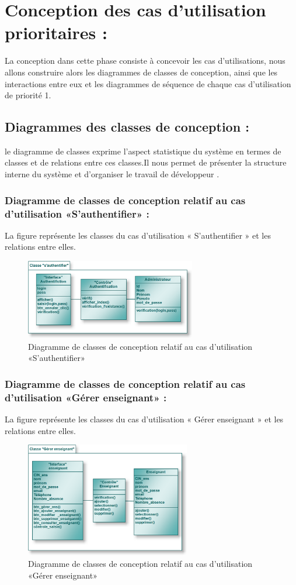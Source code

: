 \documentclass[12 pt]{report}
\begin{document}
\section{Conception des cas d’utilisation prioritaires :}
La conception dans cette phase consiste à concevoir les cas d’utilisations, nous allons construire alors les diagrammes de classes de conception, ainsi que les interactions entre eux et les diagrammes de séquence de chaque cas d’utilisation de priorité 1.
\subsection{Diagrammes des classes de conception :}
le diagramme de classes exprime l'aspect statistique du système en termes de classes et de relations entre ces classes.Il nous permet de présenter la structure interne du système et d'organiser le travail de développeur .
\subsubsection{Diagramme de classes de conception relatif au cas d’utilisation «S’authentifier» :}
La figure  représente les classes du cas d’utilisation « S’authentifier » et les relations entre elles.
\begin{figure}[h]
 \begin{center}
\includegraphics[width= 12 cm ,height=  3.5cm]{cl_auth.PNG}
\caption{Diagramme de classes de conception relatif au cas d’utilisation «S’authentifier» }

\end{center}
\end{figure}
\subsubsection{Diagramme de classes de conception relatif au cas d’utilisation «Gérer enseignant» :}
La figure  représente les classes du cas d’utilisation « Gérer enseignant » et les relations entre elles.
\begin{figure}[h]
 \begin{center}
\includegraphics[width= 11 cm ,height= 5cm]{cl_ge.PNG}
\caption{Diagramme de classes de conception relatif au cas d’utilisation «Gérer enseignant»}

\end{center}
\end{figure}
\end{document}
